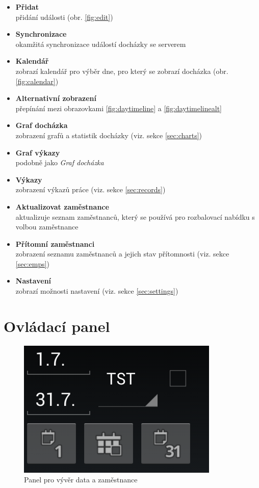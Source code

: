\documentclass{diplomka}
\begin{document}
\begin{itemize}[noitemsep,nolistsep]
\item  \textbf{Přidat}\\ přidání události (obr. \ref{fig:edit})
\item  \textbf{Synchronizace}\\ okamžitá synchronizace událostí docházky se serverem
\item  \textbf{Kalendář}\\ zobrazí kalendář pro výběr dne, pro který se zobrazí docházka (obr. \ref{fig:calendar})
\item  \textbf{Alternativní zobrazení}\\přepínání mezi obrazovkami \ref{fig:daytimeline} a \ref{fig:daytimelinealt}
\item  \textbf{Graf docházka}\\zobrazení grafů a statistik docházky (viz. sekce \ref{sec:charts})
\item  \textbf{Graf výkazy}\\podobně jako \emph{Graf docházka}\\
\item  \textbf{Výkazy}\\zobrazení výkazů práce (viz. sekce \ref{sec:records})
\item  \textbf{Aktualizovat zaměstnance}\\aktualizuje seznam zaměstnanců, který se používá pro rozbalovací nabídku s volbou zaměstnance
\item  \textbf{Přítomní zaměstnanci}\\zobrazení seznamu zaměstnanců a jejich stav přítomnosti (viz. sekce \ref{sec:emps})
\item  \textbf{Nastavení}\\zobrazí možnosti nastavení (viz. sekce \ref{sec:settings})
\end{itemize}


\section{Ovládací panel}
\label{sec:panel}
\begin{figure}[H]
  \centering
  \includegraphics[scale=0.7]{obr/panel.png}
  \caption{Panel pro vývěr data a zaměstnance}
  \label{fig:panel}
\end{figure}
\end{document}
